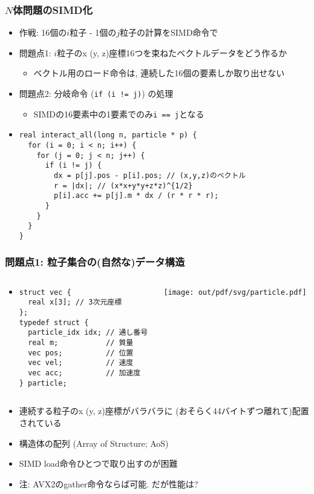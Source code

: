 \documentclass[10pt,dvipdfmx]{beamer}
\newcommand{\ao}[1]{{\color{blue}#1}}
\begin{document}
\begin{frame}[fragile]
\frametitle{$N$体問題のSIMD化}
\begin{itemize}
\item 作戦: 16個の$i$粒子 - 1個の$j$粒子の計算をSIMD命令で
  
\item 問題点1: $i$粒子のx (y, z)座標16つを束ねたベクトルデータをどう作るか
  \begin{itemize}
  \item ベクトル用のロード命令は, \ao{連続した}16個の要素しか取り出せない
  \end{itemize}
  
\item 問題点2: 分岐命令 (\texttt{if (i != j)}) の処理
  \begin{itemize}
  \item SIMDの16要素中の1要素でのみ\texttt{i == j}となる
  \end{itemize}

\item []
\begin{lstlisting}
real interact_all(long n, particle * p) {
  for (i = 0; i < n; i++) {
    for (j = 0; j < n; j++) {
      if (i != j) {
        dx = p[j].pos - p[i].pos; // (x,y,z)のベクトル
        r = |dx|; // (x*x+y*y+z*z)^{1/2}
        p[i].acc += p[j].m * dx / (r * r * r);
      }
    }
  }
}
\end{lstlisting}
  
\end{itemize}
\end{frame}

\begin{frame}[fragile]
  \frametitle{問題点1: 粒子集合の(自然な)データ構造}
  \begin{itemize}
  \item []
    \begin{columns}
      \begin{column}{0.5\textwidth}
\begin{lstlisting}
struct vec {
  real x[3]; // 3次元座標
};
typedef struct {
  particle_idx idx; // 通し番号
  real m;           // 質量
  vec pos;          // 位置
  vec vel;          // 速度
  vec acc;          // 加速度
} particle;
\end{lstlisting}
\end{column}
\begin{column}{0.5\textwidth}
\begin{center}
  \texttt{[image: out/pdf/svg/particle.pdf]}
\end{center}
    \end{column}
\end{columns}
\item 連続する粒子のx (y, z)座標がバラバラに
  (おそらく44バイトずつ離れて)配置されている
\item 構造体の配列 (Array of Structure; AoS)
\item SIMD load命令ひとつで取り出すのが困難
\item 注: AVX2のgather命令ならば可能. だが性能は?
\end{itemize}
\end{frame}
\end{document}

